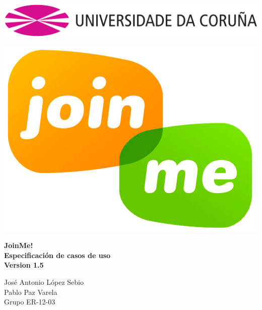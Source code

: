 \documentclass[12pt, a4paper, titlepage]{article}
\begin{document}

\begin{titlepage}

\includegraphics[width=15cm]{Imagenes/Simbolo_logo_UDC.png}

\vspace{3cm}

\begin{center}
\includegraphics[scale=0.3]{Imagenes/1a_Practica_ER_14-15.png}
\end{center}

\begin{flushright}
	\LARGE{\textbf{ JoinMe!}}\\
	\LARGE{\textbf{Especificación de casos de uso}}\\
	\large{\textbf{Version 1.5}}
	
		
\end{flushright}
\vspace{1cm}
\begin{center}
José Antonio López Sebio\\
Pablo Paz Varela\\
Grupo ER-12-03\\
\end{center}


\end{titlepage}
\end{document}
